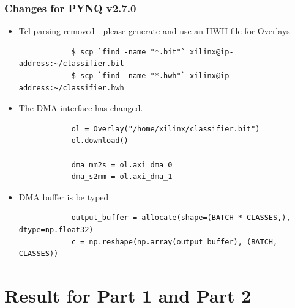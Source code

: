 \documentclass[aspectratio=169]{beamer}
\begin{document}
\begin{frame}[fragile]
    \frametitle{Changes for PYNQ v2.7.0}

    \begin{itemize}
        \item Tcl parsing removed - please generate and use an HWH file for Overlays
              \begin{verbatim}
            $ scp `find -name "*.bit"` xilinx@ip-address:~/classifier.bit
            $ scp `find -name "*.hwh"` xilinx@ip-address:~/classifier.hwh
        \end{verbatim}
        \item The DMA interface has changed.
              \begin{verbatim}
            ol = Overlay("/home/xilinx/classifier.bit")
            ol.download()

            dma_mm2s = ol.axi_dma_0
            dma_s2mm = ol.axi_dma_1
        \end{verbatim}
        \item DMA buffer is be typed
              \begin{verbatim}
            output_buffer = allocate(shape=(BATCH * CLASSES,), dtype=np.float32)
            c = np.reshape(np.array(output_buffer), (BATCH, CLASSES))
        \end{verbatim}
    \end{itemize}

\end{frame}

\section{Result for Part 1 and Part 2}
\end{document}
